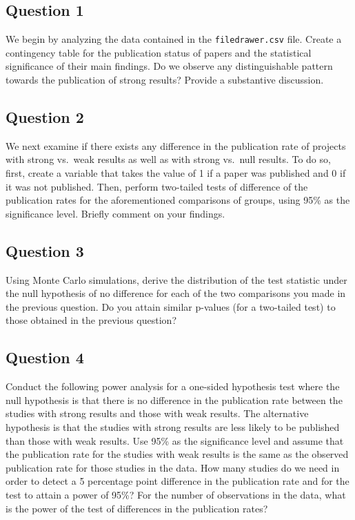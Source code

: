\documentclass[]{article}
\begin{document}
\subsection{Question 1}\label{question-1}

We begin by analyzing the data contained in the \texttt{filedrawer.csv}
file. Create a contingency table for the publication status of papers
and the statistical significance of their main findings. Do we observe
any distinguishable pattern towards the publication of strong results?
Provide a substantive discussion.

\subsection{Question 2}\label{question-2}

We next examine if there exists any difference in the publication rate
of projects with strong vs.~weak results as well as with strong vs.~null
results. To do so, first, create a variable that takes the value of 1 if
a paper was published and 0 if it was not published. Then, perform
two-tailed tests of difference of the publication rates for the
aforementioned comparisons of groups, using 95\% as the significance
level. Briefly comment on your findings.

\subsection{Question 3}\label{question-3}

Using Monte Carlo simulations, derive the distribution of the test
statistic under the null hypothesis of no difference for each of the two
comparisons you made in the previous question. Do you attain similar
p-values (for a two-tailed test) to those obtained in the previous
question?

\subsection{Question 4}\label{question-4}

Conduct the following power analysis for a one-sided hypothesis test
where the null hypothesis is that there is no difference in the
publication rate between the studies with strong results and those with
weak results. The alternative hypothesis is that the studies with strong
results are less likely to be published than those with weak results.
Use 95\% as the significance level and assume that the publication rate
for the studies with weak results is the same as the observed
publication rate for those studies in the data. How many studies do we
need in order to detect a 5 percentage point difference in the
publication rate and for the test to attain a power of 95\%? For the
number of observations in the data, what is the power of the test of
differences in the publication rates?
\end{document}
